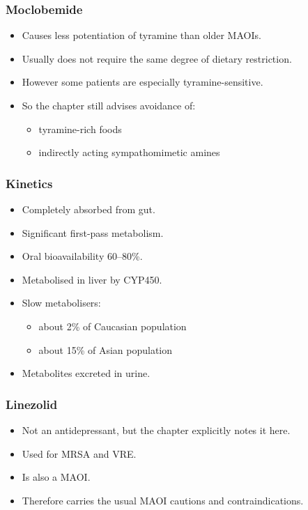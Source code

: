 \documentclass[11pt,a4paper]{article}
\begin{document}
\subsubsection{Moclobemide}
\begin{itemize}
  \item Causes less potentiation of tyramine than older MAOIs.
  \item Usually does not require the same degree of dietary restriction.
  \item However some patients are especially tyramine-sensitive.
  \item So the chapter still advises avoidance of:
  \begin{itemize}
    \item tyramine-rich foods
    \item indirectly acting sympathomimetic amines
  \end{itemize}
\end{itemize}

\subsubsection{Kinetics}
\begin{itemize}
  \item Completely absorbed from gut.
  \item Significant first-pass metabolism.
  \item Oral bioavailability 60--80\%.
  \item Metabolised in liver by CYP450.
  \item Slow metabolisers:
  \begin{itemize}
    \item about 2\% of Caucasian population
    \item about 15\% of Asian population
  \end{itemize}
  \item Metabolites excreted in urine.
\end{itemize}

\subsubsection{Linezolid}
\begin{itemize}
  \item Not an antidepressant, but the chapter explicitly notes it here.
  \item Used for MRSA and VRE.
  \item Is also a MAOI.
  \item Therefore carries the usual MAOI cautions and contraindications.
\end{itemize}
\end{document}
